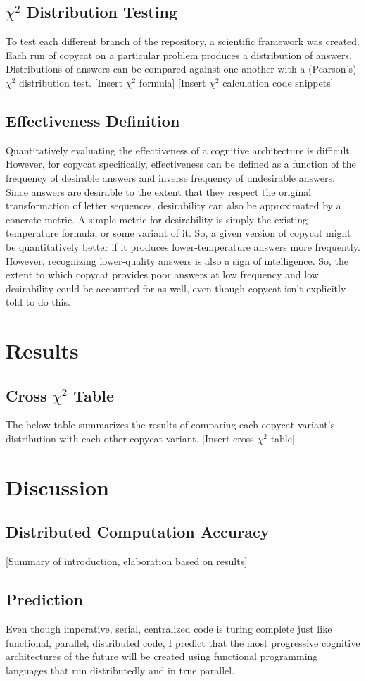 \documentclass[a4paper]{article}
\begin{document}
    \subsection{$\chi^2$ Distribution Testing}
        To test each different branch of the repository, a scientific framework was created.
        Each run of copycat on a particular problem produces a distribution of answers.
        Distributions of answers can be compared against one another with a (Pearson's) $\chi^2$ distribution test.
        [Insert $\chi^2$ formula]
        [Insert $\chi^2$ calculation code snippets]
    \subsection{Effectiveness Definition}
        Quantitatively evaluating the effectiveness of a cognitive architecture is difficult.
        However, for copycat specifically, effectiveness can be defined as a function of the frequency of desirable answers and inverse frequency of undesirable answers.
        Since answers are desirable to the extent that they respect the original transformation of letter sequences, desirability can also be approximated by a concrete metric.
        A simple metric for desirability is simply the existing temperature formula, or some variant of it.
        So, a given version of copycat might be quantitatively better if it produces lower-temperature answers more frequently.
        However, recognizing lower-quality answers is also a sign of intelligence.
        So, the extent to which copycat provides poor answers at low frequency and low desirability could be accounted for as well, even though copycat isn't explicitly told to do this.
       
\section{Results}
    \subsection{Cross $\chi^2$ Table}
        The below table summarizes the results of comparing each copycat-variant's distribution with each other copycat-variant.
        [Insert cross $\chi^2$ table]
\section{Discussion}
    \subsection{Distributed Computation Accuracy}
        [Summary of introduction, elaboration based on results]
    \subsection{Prediction}
        Even though imperative, serial, centralized code is turing complete just like functional, parallel, distributed code, I predict that the most progressive cognitive architectures of the future will be created using functional programming languages that run distributedly and in true parallel. 



\end{document}
